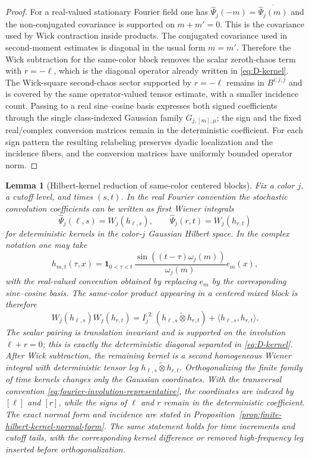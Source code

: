 \documentclass[10pt]{amsart}
\numberwithin{equation}{section}
\theoremstyle{plain}
\newtheorem{lemma}[theorem]{Lemma}
\theoremstyle{definition}
\theoremstyle{remark}
\begin{document}
\begin{proof}
For a real-valued stationary Fourier field one has $\widehat\Psi_j(-m)=\overline{\widehat\Psi_j(m)}$ and the non-conjugated covariance is supported on $m+m'=0$.  This is the covariance used by Wick contraction inside products.  The conjugated covariance used in second-moment estimates is diagonal in the usual form $m=m'$.  Therefore the Wick subtraction for the same-color block removes the scalar zeroth-chaos term with $r=-\ell$, which is the diagonal operator already written in \eqref{eq:D-kernel}.  The Wick-square second-chaos sector supported by $r=-\ell$ remains in $B^{i;j,j}$ and is covered by the same operator-valued tensor estimate, with a smaller incidence count.  Passing to a real sine--cosine basis expresses both signed coefficients through the single class-indexed Gaussian family $G_{j,[m],\mu}$; the sign and the fixed real/complex conversion matrices remain in the deterministic coefficient.  For each sign pattern the resulting relabeling preserves dyadic localization and the incidence fibers, and the conversion matrices have uniformly bounded operator norm.
\end{proof}


\begin{lemma}[Hilbert-kernel reduction of same-color centered blocks]\label{lem:same-color-hilbert-kernel-reduction}
Fix a color $j$, a cutoff level, and times $(s,t)$.  In the real Fourier convention the stochastic convolution coefficients can be written as first Wiener integrals
\[
        \widehat\Psi_j(\ell,s)=W_j(h_{\ell,s}),
        \qquad
        \widehat\Psi_j(r,t)=W_j(h_{r,t})
\]
for deterministic kernels in the color-$j$ Gaussian Hilbert space.  In the complex notation one may take
\[
        h_{m,t}(\tau,x)=\mathbf 1_{0<\tau<t}\,
        \frac{\sin((t-\tau)\omega_j(m))}{\omega_j(m)}e_m(x),
\]
with the real-valued convention obtained by replacing $e_m$ by the corresponding sine--cosine basis.  The same-color product appearing in a centered mixed block is therefore
\[
        W_j(h_{\ell,s})W_j(h_{r,t})
        =I_j^{:2:}(h_{\ell,s}\widetilde\otimes h_{r,t})
        +\langle h_{\ell,s},h_{r,t}\rangle.
\]
The scalar pairing is translation invariant and is supported on the involution $\ell+r=0$; this is exactly the deterministic diagonal separated in \eqref{eq:D-kernel}.  After Wick subtraction, the remaining kernel is a second homogeneous Wiener integral with deterministic tensor leg $h_{\ell,s}\widetilde\otimes h_{r,t}$.  Orthogonalizing the finite family of time kernels changes only the Gaussian coordinates.  With the transversal convention \eqref{eq:fourier-involution-representative}, the coordinates are indexed by $[\ell]$ and $[r]$, while the signs of $\ell$ and $r$ remain in the deterministic coefficient.  The exact normal form and incidence are stated in Proposition~\ref{prop:finite-hilbert-kernel-normal-form}.  The same statement holds for time increments and cutoff tails, with the corresponding kernel difference or removed high-frequency leg inserted before orthogonalization.
\end{lemma}
\end{document}
